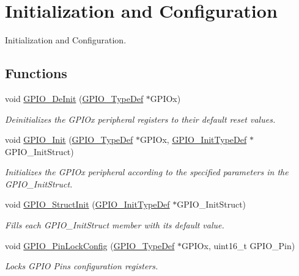 \hypertarget{group___g_p_i_o___group1}{}\section{Initialization and Configuration}
\label{group___g_p_i_o___group1}


Initialization and Configuration.  


\subsection*{Functions}
\begin{DoxyCompactItemize}
\item 
void \hyperlink{group___g_p_i_o___group1_gaa60bdf3182c44b5fa818f237042f52ee}{G\+P\+I\+O\+\_\+\+De\+Init} (\hyperlink{struct_g_p_i_o___type_def}{G\+P\+I\+O\+\_\+\+Type\+Def} $\ast$G\+P\+I\+Ox)
\begin{DoxyCompactList}\small\item\em Deinitializes the G\+P\+I\+Ox peripheral registers to their default reset values. \end{DoxyCompactList}\item 
void \hyperlink{group___g_p_i_o___group1_ga71abf9404261370d03cca449b88d3a65}{G\+P\+I\+O\+\_\+\+Init} (\hyperlink{struct_g_p_i_o___type_def}{G\+P\+I\+O\+\_\+\+Type\+Def} $\ast$G\+P\+I\+Ox, \hyperlink{struct_g_p_i_o___init_type_def}{G\+P\+I\+O\+\_\+\+Init\+Type\+Def} $\ast$G\+P\+I\+O\+\_\+\+Init\+Struct)
\begin{DoxyCompactList}\small\item\em Initializes the G\+P\+I\+Ox peripheral according to the specified parameters in the G\+P\+I\+O\+\_\+\+Init\+Struct. \end{DoxyCompactList}\item 
void \hyperlink{group___g_p_i_o___group1_gab28de41278e7f8c63d0851e2733b10df}{G\+P\+I\+O\+\_\+\+Struct\+Init} (\hyperlink{struct_g_p_i_o___init_type_def}{G\+P\+I\+O\+\_\+\+Init\+Type\+Def} $\ast$G\+P\+I\+O\+\_\+\+Init\+Struct)
\begin{DoxyCompactList}\small\item\em Fills each G\+P\+I\+O\+\_\+\+Init\+Struct member with its default value. \end{DoxyCompactList}\item 
void \hyperlink{group___g_p_i_o___group1_gad2f2e615928c69fd0d8c641a7cedaafc}{G\+P\+I\+O\+\_\+\+Pin\+Lock\+Config} (\hyperlink{struct_g_p_i_o___type_def}{G\+P\+I\+O\+\_\+\+Type\+Def} $\ast$G\+P\+I\+Ox, uint16\+\_\+t G\+P\+I\+O\+\_\+\+Pin)
\begin{DoxyCompactList}\small\item\em Locks G\+P\+I\+O Pins configuration registers. \end{DoxyCompactList}\end{DoxyCompactItemize}


